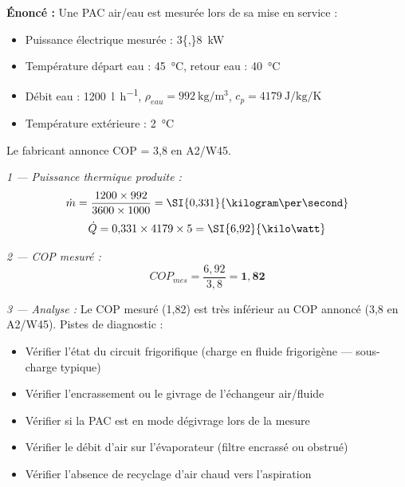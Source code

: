 \begin{exemple}[title=Analyse des performances d'une PAC en exploitation]
\textbf{Énoncé :} Une PAC air/eau est mesurée lors de sa mise en service :
\begin{itemize}
  \item Puissance électrique mesurée : \SI{3{,}8}{\kilo\watt}
  \item Température départ eau : \SI{45}{\celsius}, retour eau : \SI{40}{\celsius}
  \item Débit eau : \SI{1200}{\litre\per\hour}, $\rho_{eau} = \SI{992}{\kilogram\per\cubic\metre}$, $c_p = \SI{4179}{\joule\per\kilogram\per\kelvin}$
  \item Température extérieure : \SI{2}{\celsius}
\end{itemize}
Le fabricant annonce COP = 3,8 en A2/W45.

\textit{1 — Puissance thermique produite :}
\[
  \dot{m} = \frac{1200 \times 992}{3600 \times 1000} = \SI{0{,}331}{\kilogram\per\second}
\]
\[
  \dot{Q} = 0{,}331 \times 4179 \times 5 = \SI{6{,}92}{\kilo\watt}
\]

\textit{2 — COP mesuré :}
\[
  COP_{mes} = \frac{6{,}92}{3{,}8} = \mathbf{1{,}82}
\]

\textit{3 — Analyse :} Le COP mesuré (1,82) est très inférieur au COP annoncé (3,8 en A2/W45). Pistes de diagnostic :
\begin{itemize}
  \item Vérifier l'état du circuit frigorifique (charge en fluide frigorigène — sous-charge typique)
  \item Vérifier l'encrassement ou le givrage de l'échangeur air/fluide
  \item Vérifier si la PAC est en mode dégivrage lors de la mesure
  \item Vérifier le débit d'air sur l'évaporateur (filtre encrassé ou obstrué)
  \item Vérifier l'absence de recyclage d'air chaud vers l'aspiration
\end{itemize}
\end{exemple}

